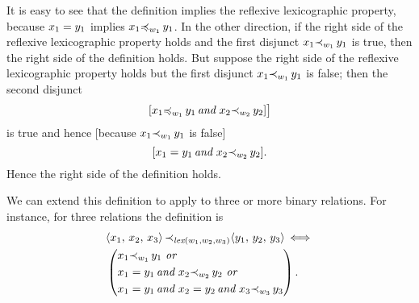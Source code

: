 \documentclass[runningheads]{llncs}
\DeclareMathOperator{\uand}{\emph{and}\,}
\DeclareMathOperator{\uor}{\emph{or}\,}
\DeclareMathOperator{\uiff}{\iff}
\DeclareMathOperator{\lex}{\emph{lex}}
\begin{document}
  \noindent It is easy to see that the definition implies the reflexive lexicographic property, because ${x}_{1} = {y}_{1}$ implies ${x}_{1} {\preccurlyeq}_{{w}_{1}} \, {y}_{1}$. 
  In the other direction, if the right side of the reflexive lexicographic property holds and the first disjunct ${x}_{1} {\prec}_{{w}_{1}} \, {y}_{1}$ is true, then  the right side of the definition holds.
  But suppose the right side of the reflexive lexicographic property holds but the first disjunct ${x}_{1} {\prec}_{{w}_{1}} \, {y}_{1}$ is false;  then the second disjunct \[[\varsub{x}{1} \expsub{\preccurlyeq}{\expsub{w}{1}} \, \expsub{\var{y}}{1} \uand
  \varsub{x}{2} \expsub{\prec}{\expsub{w}{2}} \, \expsub{\var{y}}{2}]\bigr]\] is true and hence [because ${x}_{1} {\prec}_{{w}_{1}} \, {y}_{1}$ is false]
  \[ [\varsub{x}{1} = \expsub{\var{y}}{1} \uand \varsub{x}{2} \expsub{\prec}{\expsub{w}{2}} \, \expsub{\var{y}}{2}]. \]
Hence the right side of the definition holds.

 We can extend this definition to apply to three or more binary relations. For instance, for three relations the definition is
  \begin{alignat*}{2}
  \begin{split}
  &\langle \varsub{x}{1}, \,  \varsub{x}{2}, \,  \varsub{x}{3}\rangle \, \expsub{\prec}{\lex(\expsub{w}{1}, \expsub{w}{2}, \expsub{w}{3})} \langle \varsub{y}{1}, \,  \varsub{y}{2}, \,  \varsub{y}{3}\rangle
  \uiff \\
  &\left(\begin{aligned}
  &\varsub{x}{1} \expsub{\prec}{\expsub{w}{1}} \, \varsub{y}{1} \, \uor \, \\
  &\varsub{x}{1} = \varsub{y}{1} \uand
  \varsub{x}{2} \expsub{\prec}{\expsub{w}{2}} \, \varsub{y}{2}\, \uor \, \\
  &\varsub{x}{1} = \varsub{y}{1} \uand \varsub{x}{2} = \varsub{y}{2} \uand
  \varsub{x}{3} \expsub{\prec}{\expsub{w}{3}} \, \varsub{y}{3}
  \end{aligned}\right).
  \end{split}
\end{alignat*} 

  
  
\end{document}
